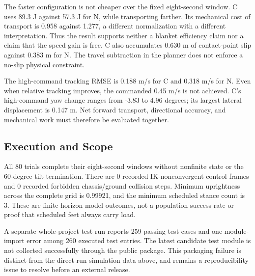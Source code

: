 The faster configuration is not cheaper over the fixed eight-second window. C uses 89.3 J against 57.3 J for N, while transporting farther. Its mechanical cost of transport is 0.958 against 1.277, a different normalization with a different interpretation. Thus the result supports neither a blanket efficiency claim nor a claim that the speed gain is free. C also accumulates 0.630 m of contact-point slip against 0.383 m for N. The travel subtraction in the planner does not enforce a no-slip physical constraint.

The high-command tracking RMSE is 0.188 m/s for C and 0.318 m/s for N. Even when relative tracking improves, the commanded 0.45 m/s is not achieved. C's high-command yaw change ranges from -3.83 to 4.96 degrees; its largest lateral displacement is 0.147 m. Net forward transport, directional accuracy, and mechanical work must therefore be evaluated together.

\subsection{Execution and Scope}
All 80 trials complete their eight-second windows without nonfinite state or the 60-degree tilt termination. There are 0 recorded IK-nonconvergent control frames and 0 recorded forbidden chassis/ground collision steps. Minimum uprightness across the complete grid is 0.99921, and the minimum scheduled stance count is 3. These are finite-horizon model outcomes, not a population success rate or proof that scheduled feet always carry load.

A separate whole-project test run reports 259 passing test cases and one module-import error among 260 executed test entries. The latest candidate test module is not collected successfully through the public package. This packaging failure is distinct from the direct-run simulation data above, and remains a reproducibility issue to resolve before an external release.
